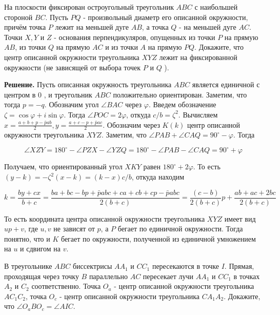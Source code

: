 На плоскости фиксирован остроугольный треугольник $A B C$ с наибольшей стороной $B C$. Пусть $P Q$ - произвольный диаметр его описанной окружности, причём точка $P$ лежит на меньшей дуге $A B$, а точка $Q$ - на меньшей дуге $A C$. Точки $X, Y$ и $Z$ - основания перпендикуляров, опущенных из точки $P$ на прямую $A B$, из точки $Q$ на прямую $A C$ и из точки $A$ на прямую $P Q$. Докажите, что центр описанной окружности треугольника $X Y Z$ лежит на фиксированной окружности (не зависящей от выбора точек $P$ и $Q$ ).

\textbf{Решение.}
Пусть описанная окружность треугольника $A B C$ является единичной с центром в 0 , и треугольник $A B C$ положительно ориентирован. Заметим, что тогда $p=-q$. Обозначим угол $\angle B A C$ через $\varphi$. Введем обозначение $\zeta=\cos \varphi+i \sin \varphi$. Тогда $\angle P O C=2 \varphi$, откуда $c / b=\zeta^2$. Вычисляем $x=\frac{a+b+p-\bar{p} a b}{2}, y=\frac{a+c-p+\bar{p} a c}{2}$.
Обозначим через $K(k)$ центр описанной окружности треугольника $X Y Z$. Заметим, что $\angle P A B+\angle C A Q=90^{\circ}-\varphi$. Тогда

$$
\angle X Z Y=180^{\circ}-\angle P Z X-\angle Y Z Q=180^{\circ}-\angle P A B-\angle C A Q=90^{\circ}+\varphi
$$


Получаем, что ориентированный угол $X K Y$ равен $180^{\circ}+2 \varphi$. То есть $(y-k)=-\zeta^2(x-k)=(k-x) c / b$, откуда находим

$$
k=\frac{b y+c x}{b+c}=\frac{b a+b c-b p+\bar{p} a b c+c a+c b+c p-\bar{p} a b c}{2(b+c)}=\frac{(c-b)}{2(b+c)} p+\frac{a b+a c+2 b c}{2(b+c)}
$$


То есть координата центра описанной окружности треугольника $X Y Z$ имеет вид $u p+v$, где $u, v$ не зависят от $p$, а $P$ бегает по единичной окружности. Тогда понятно, что и $K$ бегает по окружности, полученной из единичной умножением на $u$ и сдвигом на $v$.


В треугольнике $A B C$ биссектрисы $A A_1$ и $C C_1$ пересекаются в точке $I$. Прямая, проходящая через точку $B$ параллельно $A C$ пересекает лучи $A A_1$ и $C C_1$ в точках $A_2$ и $C_2$ соответственно. Точка $O_a$ - центр описанной окружности треугольника $A C_1 C_2$, точка $O_c$ - центр описанной окружности треугольника $C A_1 A_2$. Докажите, что $\angle O_a B O_c=\angle A I C$.

